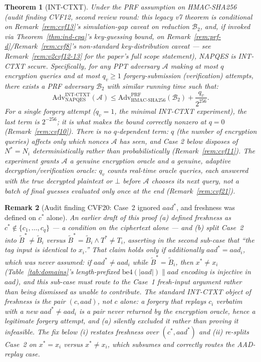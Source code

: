 \documentclass[11pt,a4paper]{article}
\newtheorem{theorem}{Theorem}[section]
\newtheorem{remark}[theorem]{Remark}
\begin{document}
\begin{theorem}[INT-CTXT]\label{thm:int-ctxt}
  Under the PRF assumption on HMAC-SHA256 (audit finding CVF12, second
  review round: this legacy v7 theorem is conditional on
  Remark~\ref{rem:cvf13}'s simulation-gap caveat on reduction
  $\mathcal{B}_2$, and, if invoked via Theorem~\ref{thm:ind-cpa}'s
  key-guessing bound, on Remark~\ref{rem:prf-d}/Remark~\ref{rem:cvf8}'s
  non-standard key-distribution caveat --- see Remark~\ref{rem:v2cvf12-13}
  for the paper's full scope statement), NAPQES is INT-CTXT secure.
  Specifically, for any PPT adversary $\mathcal{A}$ making at most $q$
  encryption queries and at most $q_v \geq 1$ forgery-submission
  (verification) attempts, there exists a PRF adversary $\mathcal{B}_2$
  with similar running time such that:
  \[
    \mathrm{Adv}^{\mathrm{INT\text{-}CTXT}}_{\mathrm{NAPQES}}(\mathcal{A})
    \leq
    \mathrm{Adv}^{\mathrm{PRF}}_{\mathrm{HMAC\text{-}SHA256}}(\mathcal{B}_2)
    + \frac{q_v}{2^{256}}.
  \]
  For a single forgery attempt ($q_v = 1$, the minimal INT-CTXT
  experiment), the last term is $2^{-256}$; it is what makes the bound
  correctly nonzero at $q=0$ (Remark~\ref{rem:cvf10}). There is no
  $q$-dependent term: $q$ (the number of encryption queries) affects only
  which nonces $\mathcal{A}$ has seen, and Case 2 below disposes of
  $N^*=N_i$ deterministically rather than probabilistically
  (Remark~\ref{rem:cvf11}). The experiment grants $\mathcal{A}$ a genuine
  encryption oracle and a genuine, \emph{adaptive} decryption/verification
  oracle: $q_v$ counts real-time oracle queries, each answered with the
  true decrypted plaintext or $\bot$ before $\mathcal{A}$ chooses its next
  query, not a batch of final guesses evaluated only once at the end
  (Remark~\ref{rem:cvf21}).
\end{theorem}

\begin{remark}[Audit finding CVF20: Case~2 ignored $aad^*$, and freshness was defined on $c^*$ alone]
\label{rem:cvf20}
An earlier draft of this proof (a) defined freshness as $c^* \notin
\{c_1,\ldots,c_q\}$ --- a condition on the ciphertext alone --- and (b)
split Case~2 into $\widetilde{B}^* \neq \widetilde{B}_i$ versus
$\widetilde{B}^* = \widetilde{B}_i \wedge T^* \neq T_i$, asserting in the
second sub-case that ``the tag input is identical to $x_i$.'' That claim
holds only if additionally $aad^* = aad_i$, which was never assumed: if
$aad^* \neq aad_i$ while $\widetilde{B}^* = \widetilde{B}_i$, then
$x^* \neq x_i$ (Table~\ref{tab:domains}'s length-prefixed
$\mathrm{be4}(|aad|)\|aad$ encoding is injective in $aad$), and this
sub-case must route to the Case~1 fresh-input argument rather than being
dismissed as unable to contribute. The standard INT-CTXT object of
freshness is the pair $(c,aad)$, not $c$ alone: a forgery that replays
$c_i$ verbatim with a new $aad^* \neq aad_i$ is a pair never returned by
the encryption oracle, hence a legitimate forgery attempt, and (a) silently
excluded it rather than proving it infeasible. The fix below (i) restates
freshness over $(c^*,aad^*)$ and (ii) re-splits Case~2 on $x^*=x_i$ versus
$x^*\neq x_i$, which subsumes and correctly routes the AAD-replay case.
\end{remark}
\end{document}
